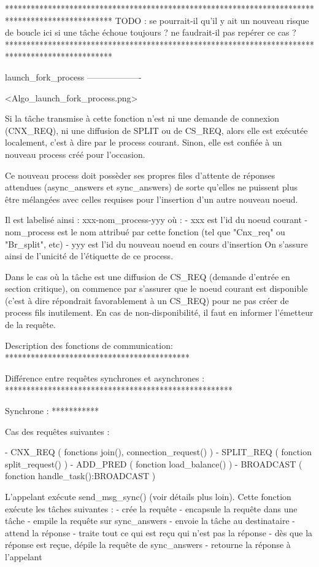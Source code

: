 *************************************************************************************************
TODO : se pourrait-il qu'il y ait un nouveau risque de boucle ici si une tâche échoue toujours ?
       ne faudrait-il pas repérer ce cas ?
*************************************************************************************************


launch_fork_process
-------------------

<Algo_launch_fork_process.png>

Si la tâche transmise à cette fonction n'est ni une demande de connexion (CNX_REQ), ni une
diffusion de SPLIT ou de CS_REQ, alors elle est exécutée localement, c'est à dire par le process
courant. Sinon, elle est confiée à un nouveau process créé pour l'occasion.

Ce nouveau process doit possèder ses propres files d'attente de réponses attendues (async_answers et
sync_answers) de sorte qu'elles ne puissent plus être mélangées avec celles requises pour l'insertion
d'un autre nouveau noeud.

Il est labelisé ainsi : xxx-nom_process-yyy où :
  - xxx est l'id du noeud courant
  - nom_process est le nom attribué par cette fonction (tel que "Cnx_req" ou "Br_split", etc)
  - yyy est l'id du nouveau noeud en cours d'insertion
On s'assure ainsi de l'unicité de l'étiquette de ce process.

Dans le cas où la tâche est une diffusion de CS_REQ (demande d'entrée en section critique), on
commence par s'assurer que le noeud courant est disponible (c'est à dire répondrait favorablement à
un CS_REQ) pour ne pas créer de process fils inutilement. En cas de non-disponibilité, il faut en
informer l'émetteur de la requête.

Description des fonctions de communication:
*******************************************

Différence entre requêtes synchrones et asynchrones :
*****************************************************

Synchrone :
***********

Cas des requêtes suivantes :

- CNX_REQ ( fonctions join(), connection_request()  )
- SPLIT_REQ ( fonction split_request() )
- ADD_PRED ( fonction load_balance() )
- BROADCAST ( fonction handle_task():BROADCAST )


L'appelant exécute send_msg_sync() (voir détails plus loin). Cette fonction exécute les tâches
suivantes :
- crée la requête
- encapsule la requête dans une tâche
- empile la requête sur sync_answers
- envoie la tâche au destinataire
- attend la réponse
- traite tout ce qui est reçu qui n'est pas la réponse
- dès que la réponse est reçue, dépile la requête de sync_answers
- retourne la réponse à l'appelant

